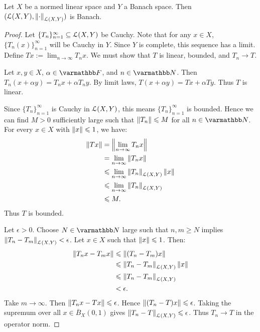 \begin{theorem}
Let $X$ be a normed linear space and $Y$ a Banach space. Then \nl $(\mathcal{L}(X,Y),\left\lVert \cdot \right\rVert_{\mathcal{L}(X,Y)})$ is Banach.
\end{theorem}
    \begin{proof}
        Let $\{T_n\}_{n = 1}^\infty \subseteq \mathcal{L}(X,Y)$ be Cauchy. Note that for any $x \in X$, $\{T_n(x)\}_{n = 1}^\infty$ will be Cauchy in $Y$. Since $Y$ is complete, this sequence has a limit. Define $Tx := \lim_{n \rightarrow \infty} T_n x$. We must show that $T$ is linear, bounded, and $T_n \rightarrow T$.

        Let $x,y \in X$, $\alpha \in \bfF$, and $n \in \bfN$. Then $T_n(x+\alpha y) = T_n x + \alpha T_n y$. By limit laws, $T(x+\alpha y) = Tx + \alpha Ty$. Thus $T$ is linear.

        Since $\{T_n\}_{n =1}^\infty$ is Cauchy in $\mathcal{L}(X,Y)$, this means $\{T_n\}_{n = 1}^\infty$ is bounded. Hence we can find $M > 0$ sufficiently large such that $\left\lVert T_n \right\rVert \leqslant M$ for all $n \in \bfN$. For every $x \in X$ with $\left\lVert x \right\rVert \leqslant 1$, we have:
            \begin{equation*}
            \begin{split}
                \left\lVert Tx \right\rVert
                & = \left\lVert \lim_{n \rightarrow \infty}T_n x \right\rVert \\
                & = \lim_{n \rightarrow \infty}\left\lVert T_n x \right\rVert \\
                & \leqslant \lim_{n \rightarrow \infty}\left\lVert T_n \right\rVert_{\mathcal{L}(X,Y)} \left\lVert x \right\rVert \\
                &\leqslant \lim_{n \rightarrow \infty}\left\lVert T_n \right\rVert_{\mathcal{L}(X,Y)} \\
                & \leqslant M.
            \end{split}
            \end{equation*}
        Thus $T$ is bounded.

        Let $\epsilon > 0$. Choose $N \in \bfN$ large such that $n,m \geq N$ implies $\left\lVert T_n - T_m \right\rVert_{\mathcal{L}(X,Y)} < \epsilon$. Let $x \in X$ such that $\left\lVert x \right\rVert \leqslant 1$. Then:
            \begin{equation*}
            \begin{split}
                \left\lVert T_n x - T_m x \right\rVert 
                & \leqslant \left\lVert (T_n - T_m)x \right\rVert \\
                & \leqslant \left\lVert T_n - T_m \right\rVert_{\mathcal{L}(X,Y)} \left\lVert x \right\rVert \\
                & \leqslant \left\lVert T_n - T_m \right\rVert_{\mathcal{L}(X,Y)} \\
                & < \epsilon.
            \end{split}
            \end{equation*}
        Take $m \rightarrow \infty$. Then $\left\lVert T_n x - Tx \right\rVert \leqslant \epsilon$. Hence $\left\lVert (T_n - T)x \right\rVert \leqslant \epsilon$. Taking the supremum over all $x \in \overline{B}_X(0,1)$ gives $\left\lVert T_n - T\right\rVert_{\mathcal{L}(X,Y)} \leqslant \epsilon$. Thus $T_n \rightarrow T$ in the operator norm.
    \end{proof}


